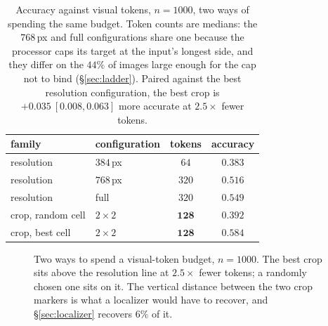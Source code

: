 \documentclass[10pt,twocolumn]{article}
\theoremstyle{plain}
\begin{document}
\begin{table}[t]
\centering\small
\setlength{\tabcolsep}{4pt}
\begin{tabular}{llcc}
\toprule
family & configuration & tokens & accuracy \\
\midrule
resolution & $384$\,px & $64$ & $0.383$ \\
resolution & $768$\,px & $320$ & $0.516$ \\
resolution & full & $320$ & $0.549$ \\
\midrule
crop, random cell & $2\times2$ & $\mathbf{128}$ & $0.392$ \\
crop, best cell & $2\times2$ & $\mathbf{128}$ & $\mathbf{0.584}$ \\
\bottomrule
\end{tabular}
\caption{Accuracy against visual tokens, $n=1000$, two ways of spending the same
budget. Token counts are medians: the $768$\,px and full configurations share
one because the processor caps its target at the input's longest side, and they
differ on the $44\%$ of images large enough for the cap not to bind
(\S\ref{sec:ladder}). Paired against the best resolution configuration, the
best crop is $+0.035\ [0.008, 0.063]$ more accurate at $2.5\times$ fewer
tokens.}
\label{tab:twoways}
\end{table}

\begin{figure}[t]
\centering
{}
\caption{Two ways to spend a visual-token budget, $n=1000$. The best crop sits
above the resolution line at $2.5\times$ fewer tokens; a randomly chosen one sits
on it. The vertical distance between the two crop markers is what a localizer
would have to recover, and \S\ref{sec:localizer} recovers $6\%$ of it.}
\label{fig:twoways}
\end{figure}
\end{document}
